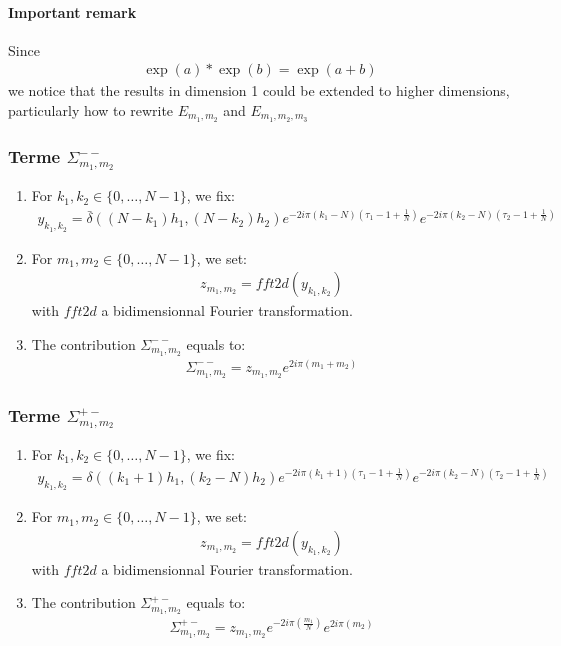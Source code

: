 \paragraph{Important remark\\}
Since
\begin{align*}
  \exp(a) * \exp(b) = \exp(a+b)
\end{align*}
we notice that the results in dimension 1 could be extended to higher dimensions, particularly how to rewrite $E_{m_1,m_2}$ and $E_{m_1,m_2,m_3}$

\subsubsection{Terme $\Sigma_{m_1,m_2}^{--}$}

\begin{enumerate}
\item For $k_1,k_2\in\{0,\hdots,N-1\}$, we fix:
\begin{align*}
y_{k_1,k_2}=\bar{\delta}((N-k_1)h_1,(N-k_2)h_2)e^{-2i\pi (k_1-N)\left(\tau_1-1+\frac{1}{N}\right)}e^{-2i\pi (k_2-N)\left(\tau_2-1+\frac{1}{N}\right)}
\end{align*}
\item For $m_1,m_2\in\{0,\hdots,N-1\}$, we set:
\begin{align*}
  z_{m_1,m_2}=fft2d(y_{k_1,k_2})
\end{align*}
with $fft2d$ a bidimensionnal Fourier transformation.
\item The contribution $\Sigma_{m_1,m_2}^{--}$ equals to:
\begin{align*}
  \Sigma_{m_1,m_2}^{--}=z_{m_1,m_2}e^{2i\pi\left(m_1+m_2\right)}
\end{align*}
\end{enumerate}

\subsubsection{Terme $\Sigma_{m_1,m_2}^{+-}$}

\begin{enumerate}
\item For $k_1,k_2\in\{0,\hdots,N-1\}$, we fix:
\begin{align*}
y_{k_1,k_2}= \delta((k_1+1)h_1,(k_2-N)h_2)e^{-2i\pi (k_1+1)\left(\tau_1-1+\frac{1}{N}\right)}e^{-2i\pi (k_2-N)\left(\tau_2-1+\frac{1}{N}\right)}
\end{align*}
\item For $m_1,m_2\in\{0,\hdots,N-1\}$, we set:
\begin{align*}
  z_{m_1,m_2}=fft2d(y_{k_1,k_2})
\end{align*}
with $fft2d$ a bidimensionnal Fourier transformation.
\item The contribution $\Sigma_{m_1,m_2}^{+-}$ equals to:
\begin{align*}
  \Sigma_{m_1,m_2}^{+-}=z_{m_1,m_2}e^{-2i\pi\left(\frac{m_1}{N}\right)} e^{2i\pi\left(m_2\right)}
\end{align*}
\end{enumerate}


